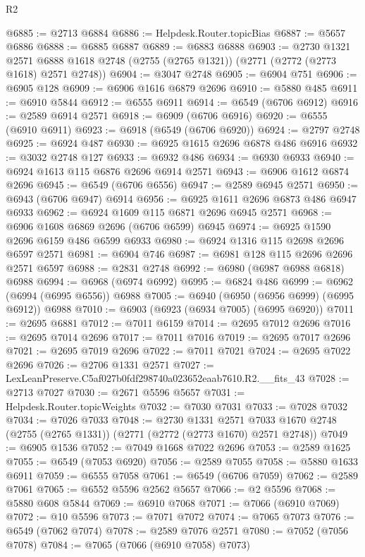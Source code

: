 \begin{lexlean}{R2}
\begin{coremodule}
@6885 := @2713 @6884
@6886 := Helpdesk.Router.topicBias
@6887 := @5657 @6886
@6888 := @6885 @6887
@6889 := @6883 @6888
@6903 := @2730
    @1321
    @2571
    @6888
    @1618
    @2748
    (@2755 (@2765 @1321))
    (@2771 (@2772 (@2773 @1618) @2571 @2748))
@6904 := @3047 @2748
@6905 := @6904 @751
@6906 := @6905 @128
@6909 := @6906 @1616 @6879 @2696
@6910 := @5880 @485
@6911 := @6910 @5844
@6912 := @6555 @6911
@6914 := @6549 (@6706 @6912)
@6916 := @2589 @6914 @2571
@6918 := @6909 (@6706 @6916)
@6920 := @6555 (@6910 @6911)
@6923 := @6918 (@6549 (@6706 @6920))
@6924 := @2797 @2748
@6925 := @6924 @487
@6930 := @6925 @1615 @2696 @6878 @486 @6916
@6932 := @3032 @2748 @127
@6933 := @6932 @486
@6934 := @6930 @6933
@6940 := @6924 @1613 @115 @6876 @2696 @6914 @2571
@6943 := @6906 @1612 @6874 @2696
@6945 := @6549 (@6706 @6556)
@6947 := @2589 @6945 @2571
@6950 := @6943 (@6706 @6947) @6914
@6956 := @6925 @1611 @2696 @6873 @486 @6947 @6933
@6962 := @6924 @1609 @115 @6871 @2696 @6945 @2571
@6968 := @6906 @1608 @6869 @2696 (@6706 @6599) @6945
@6974 := @6925 @1590 @2696 @6159 @486 @6599 @6933
@6980 := @6924 @1316 @115 @2698 @2696 @6597 @2571
@6981 := @6904 @746
@6987 := @6981 @128 @115 @2696 @2696 @2571 @6597
@6988 := @2831 @2748
@6992 := @6980 (@6987 @6988 @6818) @6988
@6994 := @6968 (@6974 @6992)
@6995 := @6824 @486
@6999 := @6962 (@6994 (@6995 @6556)) @6988
@7005 := @6940 (@6950 (@6956 @6999) (@6995 @6912)) @6988
@7010 := @6903 (@6923 (@6934 @7005) (@6995 @6920))
@7011 := @2695 @6881
@7012 := @7011 @6159
@7014 := @2695 @7012 @2696
@7016 := @2695 @7014 @2696
@7017 := @7011 @7016
@7019 := @2695 @7017 @2696
@7021 := @2695 @7019 @2696
@7022 := @7011 @7021
@7024 := @2695 @7022 @2696
@7026 := @2706 @1331 @2571
@7027 := LexLeanPreserve.C5af027b0fdf298740a023652eaab7610.R2.__fits_43
@7028 := @2713 @7027
@7030 := @2671 @5596 @5657
@7031 := Helpdesk.Router.topicWeights
@7032 := @7030 @7031
@7033 := @7028 @7032
@7034 := @7026 @7033
@7048 := @2730
    @1331
    @2571
    @7033
    @1670
    @2748
    (@2755 (@2765 @1331))
    (@2771 (@2772 (@2773 @1670) @2571 @2748))
@7049 := @6905 @1536
@7052 := @7049 @1668 @7022 @2696
@7053 := @2589 @1625
@7055 := @6549 (@7053 @6920)
@7056 := @2589 @7055
@7058 := @5880 @1633 @6911
@7059 := @6555 @7058
@7061 := @6549 (@6706 @7059)
@7062 := @2589 @7061
@7065 := @6552 @5596 @2562 @5657
@7066 := @2 @5596
@7068 := @5880 @608 @5844
@7069 := @6910 @7068
@7071 := @7066 (@6910 @7069)
@7072 := @10 @5596
@7073 := @7071 @7072
@7074 := @7065 @7073
@7076 := @6549 (@7062 @7074)
@7078 := @2589 @7076 @2571
@7080 := @7052 (@7056 @7078)
@7084 := @7065 (@7066 (@6910 @7058) @7073)

\end{coremodule}
\end{lexlean}
